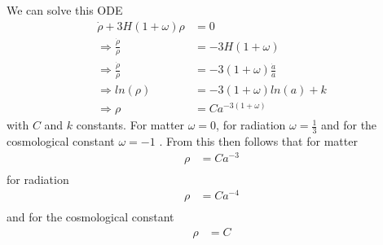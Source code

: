 \documentclass[a4paper, 11pt]{FSKH_623_Report}
\numberwithin{equation}{section}
\begin{document}
We can solve this ODE 
\begin{equation}
\begin{split}
\dot{\rho}+3H\left(1+\omega\right)\rho &= 0\\
\Rightarrow \frac{\dot{\rho}}{\rho} &= -3H\left(1+\omega\right)\\
\Rightarrow \frac{\dot{\rho}}{\rho} &= -3\left(1+\omega\right)\frac{\dot{a}}{a}\\
\Rightarrow ln(\rho) &= -3\left(1+\omega\right)ln(a) + k\\
\Rightarrow \rho &= Ca^{-3\left(1+\omega\right)}
\end{split}
\end{equation}
with $C$ and $k$ constants.
For matter $\omega=0$, for radiation $\omega=\frac{1}{3}$ and for the cosmological constant $\omega=-1$ \citep{notes4}. From this then follows that for matter 
\begin{equation}
\begin{split}
\rho &= Ca^{-3}\\
\end{split}
\end{equation}
for radiation
\begin{equation}
\begin{split}
\rho &= Ca^{-4}\\
\end{split}
\end{equation}
and for the cosmological constant
\begin{equation}
\begin{split}
\rho &= C\\
\end{split}
\end{equation}
\end{document}
